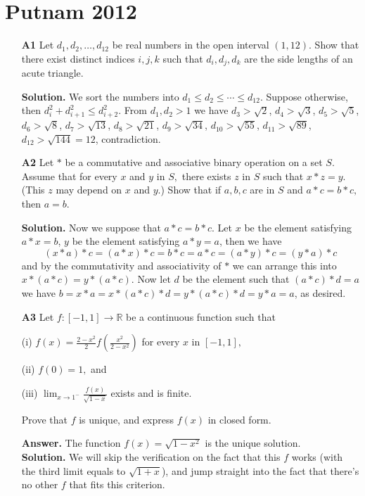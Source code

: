 \documentclass[11pt,a4paper]{article}
\newcommand{\<}{\langle}
\renewcommand{\>}{\rangle}
\begin{document}
\section{Putnam 2012}
\begin{enumerate}
	\item [\textbf{A1}]Let $d_1,d_2,\dots,d_{12}$ be real numbers in the open interval $(1,12).$ Show that there exist distinct indices $i,j,k$ such that $d_i,d_j,d_k$ are the side lengths of an acute triangle.
	
	\textbf{Solution.} We sort the numbers into $d_1 \le d_2 \le \cdots \le d_{12}$. Suppose otherwise, then $d_i^2+d_{i+1}^2\le d_{i+2}^2$. From $d_1, d_2 > 1$ we have $d_3>\sqrt{2}$, $d_4 > \sqrt{3}$, $d_5>\sqrt{5}$, $d_6 > \sqrt{8}$, $d_7 > \sqrt{13}$, $d_8 > \sqrt{21}$, $d_9 > \sqrt{34}$, $d_{10} > \sqrt{55}$, $d_{11} > \sqrt{89}$, $d_{12}>\sqrt{144}=12$, contradiction. 
	
	\item[\textbf{A2}] Let $*$ be a commutative and associative binary operation on a set $S.$ Assume that for every $x$ and $y$ in $S,$ there exists $z$ in $S$ such that $x*z=y.$ (This $z$ may depend on $x$ and $y.$) Show that if $a,b,c$ are in $S$ and $a*c=b*c,$ then $a=b.$
	
	\textbf{Solution.} Now we suppose that $a*c=b*c$. Let $x$ be the element satisfying $a*x=b$, $y$ be the element satisfying $a*y=a$, then we have
	\[(x * a) * c = (a * x) * c = b * c = a * c = (a * y) * c= (y * a) * c \]
	and by the commutativity and associativity of $*$ we can arrange this into $x * (a * c) = y * (a * c)$. Now let $d$ be the element such that $(a * c) * d = a$ we have $b = x * a = x * (a * c) * d = y * (a * c) * d = y * a = a$, as desired. 
	
	\item[\textbf{A3}]Let $f:[-1,1]\to\mathbb{R}$ be a continuous function such that
	
	(i) $f(x)=\frac{2-x^2}{2}f\left(\frac{x^2}{2-x^2}\right)$ for every $x$ in $[-1,1],$
	
	(ii) $ f(0)=1,$ and
	
	(iii) $\lim_{x\to 1^-}\frac{f(x)}{\sqrt{1-x}}$ exists and is finite.
	
	Prove that $f$ is unique, and express $f(x)$ in closed form.
	
	\textbf{Answer.} The function $f(x)=\sqrt{1-x^2}$ is the unique solution. \\
	\textbf{Solution.} We will skip the verification on the fact that this $f$ works (with the third limit equals to $\sqrt{1+x}$), and jump straight into the fact that there's no other $f$ that fits this criterion. 
	

\end{enumerate}
\end{document}
